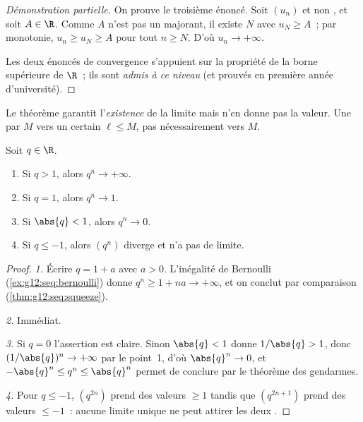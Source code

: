 \begin{proof}[Démonstration partielle]
On prouve le troisième énoncé. Soit $(u_n)$  et non , et
soit $A \in \R$. Comme $A$ n'est pas un majorant, il existe $N$ avec
$u_N \geq A$~; par monotonie, $u_n \geq u_N \geq A$ pour tout
$n \geq N$. D'où $u_n \to +\infty$.

Les deux énoncés de convergence s'appuient sur la propriété de la borne
supérieure de $\R$~; ils sont \emph{admis à ce niveau} (et prouvés en
première année d'université).
\end{proof}

\begin{remark}
Le théorème garantit l'\emph{existence} de la limite mais n'en donne pas
la valeur. Une    par $M$  vers un certain
$\ell \leq M$, pas nécessairement vers $M$.
\end{remark}

\begin{theorem}\label{thm:g12:seq:geometric}
Soit $q \in \R$.
\begin{enumerate}
  \item Si $q > 1$, alors $q^n \to +\infty$.
  \item Si $q = 1$, alors $q^n \to 1$.
  \item Si $\abs{q} < 1$, alors $q^n \to 0$.
  \item Si $q \leq -1$, alors $(q^n)$ diverge et n'a pas de limite.
\end{enumerate}
\end{theorem}

\begin{proof}
\emph{1.} Écrire $q = 1 + a$ avec $a > 0$. L'inégalité de Bernoulli
(\cref{ex:g12:seq:bernoulli}) donne $q^n \geq 1 + na \to +\infty$, et on
conclut par comparaison (\cref{thm:g12:seq:squeeze}).

\emph{2.} Immédiat.

\emph{3.} Si $q = 0$ l'assertion est claire. Sinon $\abs{q} < 1$ donne
$1/\abs{q} > 1$, donc $(1/\abs{q})^n \to +\infty$ par le point~1, d'où
$\abs{q}^n \to 0$, et $-\abs{q}^n \leq q^n \leq \abs{q}^n$ permet de
conclure par le théorème des gendarmes.

\emph{4.} Pour $q \leq -1$, $(q^{2n})$ prend des valeurs $\geq 1$ tandis
que $(q^{2n+1})$ prend des valeurs $\leq -1$~: aucune limite unique ne
peut attirer les deux .
\end{proof}

